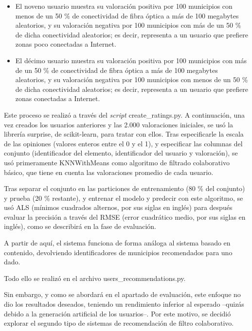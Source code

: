 \begin{itemize}
    \item El noveno usuario muestra su valoración positiva por 100 municipios con menos de un 50 \% de conectividad de fibra óptica a más de 100 megabytes aleatorios, y su valoración negativa por 100 municipios con más de un 50 \% de dicha conectividad aleatorios; es decir, representa a un usuario que prefiere zonas poco conectadas a Internet.

    \item El décimo usuario muestra su valoración positiva por 100 municipios con más de un 50 \% de conectividad de fibra óptica a más de 100 megabytes aleatorios, y su valoración negativa por 100 municipios con menos de un 50 \% de dicha conectividad aleatorios; es decir, representa a un usuario que prefiere zonas conectadas a Internet.

\end{itemize}

Este proceso se realizó a través del \textit{script} create\_ratings.py. A continuación, una vez creados los usuarios anteriores y las 2.000 valoraciones iniciales, se usó la librería surprise, de scikit-learn, para tratar con ellos. Tras especificarle la escala de las opiniones (valores enteros entre el 0 y el 1), y especificar las columnas del conjunto (identificador del elemento, identificador del usuario y valoración), se usó primeramente KNNWithMeans como algoritmo de filtrado colaborativo básico, que tiene en cuenta las valoraciones promedio de cada usuario.

Tras separar el conjunto en las particiones de entrenamiento (80 \% del conjunto) y prueba (20 \% restante), y entrenar el modelo y predecir con este algoritmo, se usó ALS (mínimos cuadrados alternos, por sus siglas en inglés) para después evaluar la precisión a través del RMSE (error cuadrático medio, por sus siglas en inglés), como se describirá en la fase de evaluación.

A partir de aquí, el sistema funciona de forma análoga al sistema basado en contenido, devolviendo identificadores de municipios recomendados para uno dado.

Todo ello se realizó en el archivo users\_recommendations.py.

Sin embargo, y como se abordará en el apartado de evaluación, este enfoque no dio los resultados deseados, teniendo un rendimiento inferior al esperado –quizás debido a la generación artificial de los usuarios–. Por este motivo, se decidió explorar el segundo tipo de sistemas de recomendación de filtro colaborativo.

